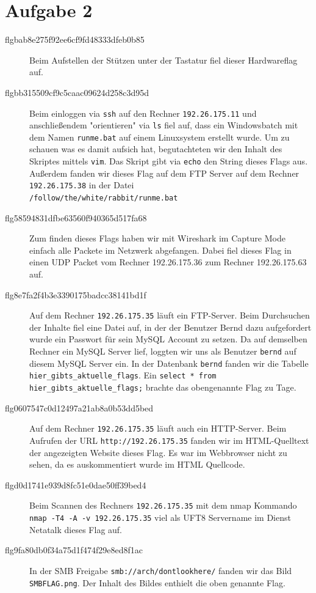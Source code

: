 \documentclass[10pt,a4paper]{article}
\begin{document}
\section{Aufgabe 2}
\begin{description}
	\item[flgbab8e275f92ee6cf9fd48333dfeb0b85] Beim Aufstellen der Stützen unter der Tastatur fiel dieser Hardwareflag auf. 
	\item[flgbb315509cf9c5caac09624d258c3d95d] Beim einloggen via \texttt{ssh} auf den Rechner \texttt{192.26.175.11} und anschließendem "orientieren" via \texttt{ls} fiel auf, dass ein Windowsbatch mit dem Namen \texttt{runme.bat} auf einem Linuxsystem erstellt wurde. Um zu schauen was es damit aufsich hat, begutachteten wir den Inhalt des Skriptes mittels \texttt{vim}. Das Skript gibt via \texttt{echo} den String dieses Flags aus.
	Außerdem fanden wir dieses Flag auf dem FTP Server auf dem Rechner \texttt{192.26.175.38} in der Datei \\ \texttt{/follow/the/white/rabbit/runme.bat}
	\item[flg58594831dfbe63560f940365d517fa68] Zum finden dieses Flags haben wir mit Wireshark im Capture Mode einfach alle Packete im Netzwerk abgefangen. Dabei fiel dieses Flag in einen UDP Packet vom Rechner 192.26.175.36 zum Rechner 192.26.175.63 auf.
	\item[flg8e7fa2f4b3e3390175badcc38141bd1f] Auf dem Rechner \texttt{192.26.175.35} läuft ein FTP-Server. Beim Durchsuchen der Inhalte fiel eine Datei auf, in der der Benutzer Bernd dazu aufgefordert wurde ein Passwort für sein MySQL Account zu setzen. Da auf demselben Rechner ein MySQL Server lief, loggten wir uns als Benutzer \texttt{bernd} auf diesem MySQL Server ein. In der Datenbank \texttt{bernd} fanden wir die Tabelle \texttt{hier\_gibts\_aktuelle\_flags}. Ein \texttt{select * from hier\_gibts\_aktuelle\_flags;} brachte das obengenannte Flag zu Tage.
	\item[flg0607547c0d12497a21ab8a0b53dd5bed] Auf dem Rechner \texttt{192.26.175.35} läuft auch ein HTTP-Server. Beim Aufrufen der URL \texttt{http://192.26.175.35} fanden wir im HTML-Quelltext der angezeigten Website dieses Flag. Es war im Webbrowser nicht zu sehen, da es auskommentiert wurde im HTML Quellcode.
	\item[flgd0d1741e939d8fc51e0dae50ff39bed4] Beim Scannen des Rechners \texttt{192.26.175.35} mit dem nmap Kommando \texttt{nmap -T4 -A -v 192.26.175.35} viel als UFT8 Servername im Dienst Netatalk dieses Flag auf.
	\item[flg9fa80db0f34a75d1f474f29e8ed8f1ac] In der SMB Freigabe \texttt{smb://arch/dontlookhere/} fanden wir das Bild \texttt{SMBFLAG.png}. Der Inhalt des Bildes enthielt die oben genannte Flag.
\end{description}
\end{document}
